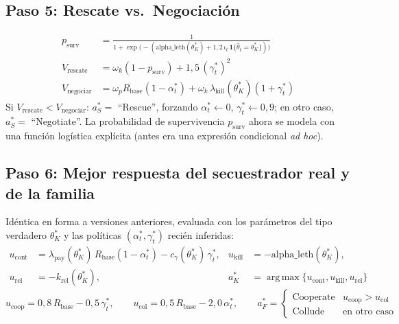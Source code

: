 \documentclass[ecta,nameyear,draft]{econsocart}
\begin{document}
\subsection{Paso 5: Rescate vs.\ Negociación}

\begin{align}
p_{\mathrm{surv}} &= \frac{1}{1+\exp\bigl(-(\mathrm{alpha\_leth}(\theta_K^\ast) + 1{,}2\,\iota_t\,\mathbf{1}\{\hat{\theta}_t=\theta_K^\ast\})\bigr)} \\
V_{\mathrm{rescate}} &= \omega_k(1-p_{\mathrm{surv}}) + 1{,}5\,(\gamma_t^\ast)^2 \\
V_{\mathrm{negociar}} &= \omega_p R_{\mathrm{base}}(1-\alpha_t^\ast) + \omega_k\,\lambda_{\mathrm{kill}}(\theta_K^\ast)(1+\gamma_t^\ast)
\end{align}
Si $V_{\mathrm{rescate}} < V_{\mathrm{negociar}}$: $a_S^\ast=$ ``Rescue'', forzando
$\alpha_t^\ast \leftarrow 0$, $\gamma_t^\ast \leftarrow 0{,}9$; en otro caso, $a_S^\ast=$
``Negotiate''. La probabilidad de supervivencia $p_{\mathrm{surv}}$ ahora se modela con una
función logística explícita (antes era una expresión condicional \emph{ad hoc}).

\subsection{Paso 6: Mejor respuesta del secuestrador real y de la familia}

Idéntica en forma a versiones anteriores, evaluada con los parámetros del tipo verdadero
$\theta_K^\ast$ y las políticas $(\alpha_t^\ast,\gamma_t^\ast)$ recién inferidas:
\begin{align}
u_{\mathrm{cont}} &= \lambda_{\mathrm{pay}}(\theta_K^\ast)\,R_{\mathrm{base}}(1-\alpha_t^\ast) - c_\gamma(\theta_K^\ast)\,\gamma_t^\ast, &
u_{\mathrm{kill}} &= -\mathrm{alpha\_leth}(\theta_K^\ast), \\
u_{\mathrm{rel}} &= -k_{\mathrm{rel}}(\theta_K^\ast), &
a_K^\ast &= \operatorname*{arg\,max}\{u_{\mathrm{cont}},u_{\mathrm{kill}},u_{\mathrm{rel}}\}
\end{align}
\begin{equation}
u_{\mathrm{coop}} = 0{,}8\,R_{\mathrm{base}} - 0{,}5\,\gamma_t^\ast, \qquad
u_{\mathrm{col}} = 0{,}5\,R_{\mathrm{base}} - 2{,}0\,\alpha_t^\ast, \qquad
a_F^\ast = \begin{cases}\text{Cooperate} & u_{\mathrm{coop}}>u_{\mathrm{col}} \\ \text{Collude} & \text{en otro caso}\end{cases}
\end{equation}
\end{document}
